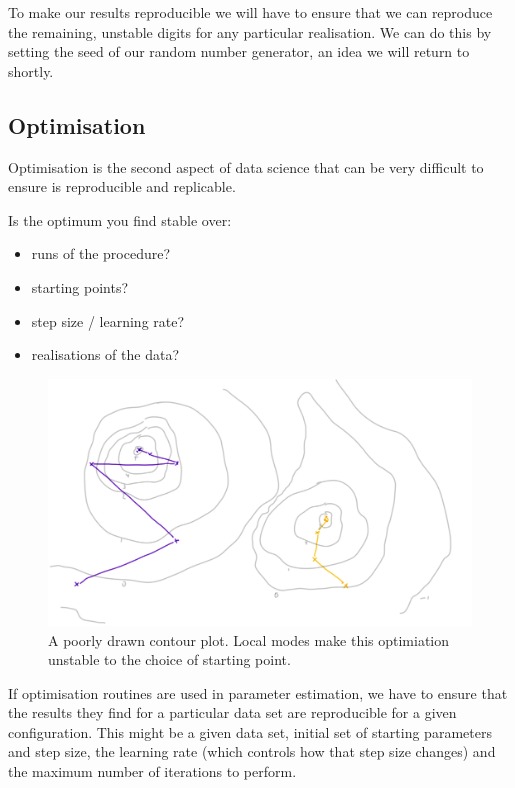 \documentclass[
  12pt,
]{book}
\providecommand{\tightlist}{%
  \setlength{\itemsep}{0pt}\setlength{\parskip}{0pt}}
\begin{document}
To make our results reproducible we will have to ensure that we can reproduce the remaining, unstable digits for any particular realisation. We can do this by setting the seed of our random number generator, an idea we will return to shortly.

\hypertarget{optimisation}{%
\subsection{Optimisation}\label{optimisation}}

Optimisation is the second aspect of data science that can be very difficult to ensure is reproducible and replicable.

Is the optimum you find stable over:

\begin{itemize}
\tightlist
\item
  runs of the procedure?
\item
  starting points?
\item
  step size / learning rate?
\item
  realisations of the data?
\end{itemize}

\begin{figure}
\centering
\includegraphics{images/401-production-reproducibility/contour-optimisation.png}
\caption{A poorly drawn contour plot. Local modes make this optimiation unstable to the choice of starting point.}
\end{figure}

If optimisation routines are used in parameter estimation, we have to ensure that the results they find for a particular data set are reproducible for a given configuration. This might be a given data set, initial set of starting parameters and step size, the learning rate (which controls how that step size changes) and the maximum number of iterations to perform.
\end{document}
